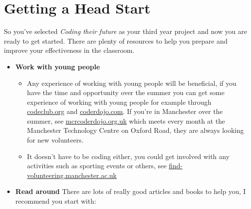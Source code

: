 \documentclass[
  12pt,
]{book}
\providecommand{\tightlist}{%
  \setlength{\itemsep}{0pt}\setlength{\parskip}{0pt}}
\begin{document}
\section{Getting a Head Start}\label{getting-a-head-start}

So you've selected \emph{Coding their future} as your third year project and now you are ready to get started. There are plenty of resources to help you prepare and improve your effectiveness in the classroom.

\begin{itemize}
\tightlist
\item
  \textbf{Work with young people}

  \begin{itemize}
  \tightlist
  \item
    Any experience of working with young people will be beneficial, if you have the time and opportunity over the summer you can get some experience of working with young people for example through \href{https://codeclub.org/}{codeclub.org} and \href{https://coderdojo.com/}{coderdojo.com}. If you're in Manchester over the summer, see \href{https://mcrcoderdojo.org.uk/}{mcrcoderdojo.org.uk} which meets every month at the Manchester Technology Centre on Oxford Road, they are always looking for new volunteers.
  \item
    It doesn't have to be coding either, you could get involved with any activities such as sporting events or others, see \href{https://find-volunteering.manchester.ac.uk/}{find-volunteering.manchester.ac.uk}
  \end{itemize}
\item
  \textbf{Read around} There are lots of really good articles and books to help you, I recommend you start with:


\end{itemize}
\end{document}
